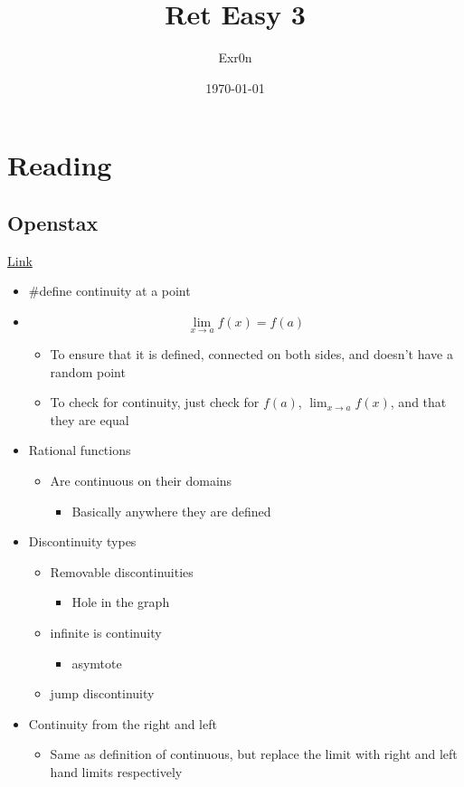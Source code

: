 \documentclass[letterpaper]{article}
\author{Exr0n}
\date{\today}
\title{Ret Easy 3}
\renewcommand{\tableofcontents}{}
\begin{document}
\tableofcontents



\section{Reading}
\label{sec:org11ec563}
\subsection{Openstax}
\label{sec:orge4a1e7d}
\href{https://openstax.org/books/calculus-volume-1/pages/2-4-continuity}{Link}

\begin{itemize}
\item \#define continuity at a point
\item \[ \lim_{x\to a}f(x) = f(a) \]

\begin{itemize}
\item To ensure that it is defined, connected on both sides, and doesn't
have a random point
\item To check for continuity, just check for \(f(a)\),
\(\lim_{x\to a}f(x)\), and that they are equal
\end{itemize}

\item Rational functions

\begin{itemize}
\item Are continuous on their domains

\begin{itemize}
\item Basically anywhere they are defined
\end{itemize}
\end{itemize}

\item Discontinuity types

\begin{itemize}
\item Removable discontinuities

\begin{itemize}
\item Hole in the graph
\end{itemize}

\item infinite is continuity

\begin{itemize}
\item asymtote
\end{itemize}

\item jump discontinuity
\end{itemize}

\item Continuity from the right and left

\begin{itemize}
\item Same as definition of continuous, but replace the limit with right
and left hand limits respectively
\end{itemize}
\end{itemize}
\end{document}
